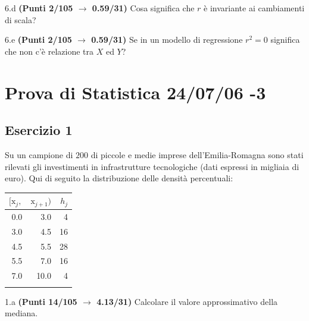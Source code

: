 \documentclass[
  11pt,
]{book}
\theoremstyle{mytheoremstyle}
\theoremstyle{mydefstyle}
\begin{document}
6.d \textbf{(Punti 2/105 \(\rightarrow\) 0.59/31)} Cosa significa che \(r\) è invariante ai cambiamenti di scala?

6.e \textbf{(Punti 2/105 \(\rightarrow\) 0.59/31)} Se in un modello di regressione \(r^2=0\) significa che non c'è relazione tra \(X\) ed \(Y\)?

\section{Prova di Statistica 24/07/06 -3}\label{prova-di-statistica-240706--3}

\subsection{Esercizio 1}\label{esercizio-1-42}

Su un campione di \(200\) di piccole e medie imprese dell'Emilia-Romagna sono stati rilevati gli investimenti in infrastrutture tecnologiche (dati espressi in migliaia di euro). Qui di seguito la distribuzione delle densità percentuali:

\begin{table}[H]
\centering
\begin{tabular}{rrr}
\toprule
$[\text{x}_j,$ & $\text{x}_{j+1})$ & $h_j$\\
\midrule
0.0 & 3.0 & 4\\
3.0 & 4.5 & 16\\
4.5 & 5.5 & 28\\
5.5 & 7.0 & 16\\
7.0 & 10.0 & 4\\
 &  & \\
\bottomrule
\end{tabular}
\end{table}

1.a \textbf{(Punti 14/105 \(\rightarrow\) 4.13/31)} Calcolare il valore approssimativo della mediana.
\end{document}
